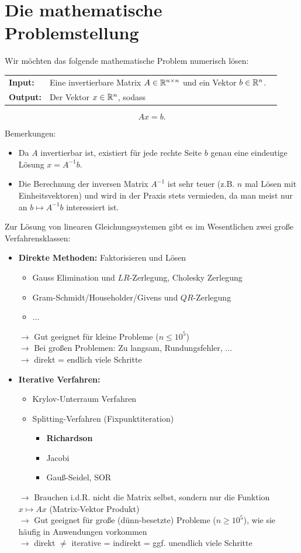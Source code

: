
\section{Die mathematische Problemstellung}
Wir möchten das folgende mathematische Problem numerisch lösen:\\
\begin{center}
	\begin{tabular}{ll}
	\textbf{Input:} &Eine invertierbare Matrix $A\in {\mathbb{R}}^{n\times n}$ und ein Vektor $b\in {\mathbb{R}}^{n}$. ~\\
\textbf{Output:} &Der Vektor $x\in {\mathbb{R}}^{n}$, sodass
\end{tabular}
$$Ax = b.$$
\end{center}
Bemerkungen:
\begin{itemize}
	\item Da $A$ invertierbar ist, existiert für jede rechte Seite $b$ genau eine eindeutige Lösung $x = A^{-1}b$.
	\item Die Berechnung der inversen Matrix $A^{-1}$ ist sehr teuer (z.B. $n$ mal Lösen mit Einheitsvektoren) und wird in der Praxis stets vermieden, da man meist nur an $b \mapsto A^{-1}b$ interessiert ist.
\end{itemize}
Zur Lösung von linearen Gleichungssystemen gibt es im Wesentlichen zwei große Verfahrensklassen:
\begin{itemize}
	\item \textbf{Direkte Methoden:} Faktorisieren und Lösen
	\begin{itemize}
		\item Gauss Elimination und $LR$-Zerlegung, Cholesky Zerlegung
		\item Gram-Schmidt/Householder/Givens und $QR$-Zerlegung
		\item ...
	\end{itemize}
    $\rightarrow$ Gut geeignet für kleine Probleme ($n \leq 10^5$)\\
    $\rightarrow$ Bei großen Problemen: Zu langsam, Rundungsfehler, ...\\
    $\rightarrow$ direkt = endlich viele Schritte
	\item \textbf{Iterative Verfahren:}
	\begin{itemize}
		\item Krylov-Unterraum Verfahren
		\item Splitting-Verfahren (Fixpunktiteration)
		\begin{itemize}
			\item \textbf{Richardson}
			\item Jacobi
			\item Gauß-Seidel, SOR
		\end{itemize}
	\end{itemize}
	    $\rightarrow$ Brauchen i.d.R. nicht die Matrix selbst, sondern nur die Funktion $x \mapsto Ax$ (Matrix-Vektor Produkt)\\
$\rightarrow$ Gut geeignet für große (dünn-besetzte) Probleme ($n \geq 10^5$), wie sie häufig in Anwendungen vorkommen\\
$\rightarrow$ direkt $\neq$ iterative = indirekt = ggf. unendlich viele Schritte
\end{itemize}
